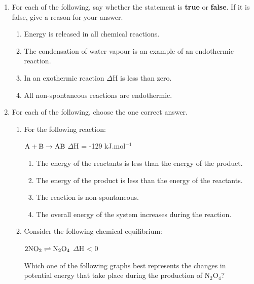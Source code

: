 \begin{eocexercises}{}

\begin{enumerate}
\item{For each of the following, say whether the statement is \textbf{true} or \textbf{false}. If it is false, give a reason for your answer.
	\begin{enumerate}
	\item{Energy is released in all chemical reactions.}
	\item{The condensation of water vapour is an example of an endothermic reaction.}
	\item{In an exothermic reaction $\Delta$H is less than zero.}
	\item{All non-spontaneous reactions are endothermic.}
	\end{enumerate}
}

\item{For each of the following, choose the one correct answer.}

	\begin{enumerate}
	\item{For the following reaction:

\begin{center}
$\rm{A + B \rightarrow AB}$ $\Delta$H = -129 kJ.mol$^{-1}$
\end{center}
}
		\begin{enumerate}
		\item{The energy of the reactants is less than the energy of the product.}
		\item{The energy of the product is less than the energy of the reactants.}
		\item{The reaction is non-spontaneous.}
		\item{The overall energy of the system increases during the reaction.}
		\end{enumerate}
	

	\item{Consider the following chemical equilibrium:

\begin{center}
$\rm{2NO_{2} \rightleftharpoons N_{2}O_{4}}$  $\Delta$H < 0
\end{center}

Which one of the following graphs best represents the changes in potential energy that take place during the production of N$_{2}$O$_{4}$?}\\


\end{enumerate}
\end{enumerate}
\end{eocexercises}
